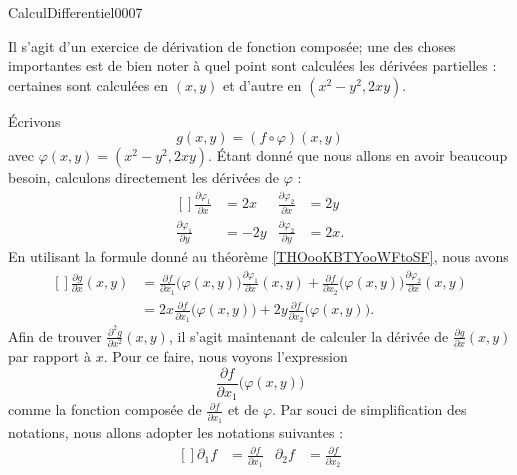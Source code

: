 \begin{corrige}{CalculDifferentiel0007}

	Il s'agit d'un exercice de dérivation de fonction composée; une des choses importantes est de bien noter à quel point sont calculées les dérivées partielles : certaines sont calculées en $(x,y)$ et d'autre en $(x^2-y^2,2xy)$. 

	Écrivons
	\begin{equation}
		g(x,y)=(f\circ\varphi)(x,y)
	\end{equation}
	avec $\varphi(x,y)=(x^2-y^2,2xy)$. Étant donné que nous allons en avoir beaucoup besoin, calculons directement les dérivées de $\varphi$ :
	\begin{equation}
		\begin{aligned}[]
			\frac{ \partial \varphi_1 }{ \partial x }&=2x	&\frac{ \partial \varphi_2 }{ \partial x }&=2y\\
			\frac{ \partial \varphi_1 }{ \partial y }&=-2y	&\frac{ \partial \varphi_2 }{ \partial y }&=2x.
		\end{aligned}
	\end{equation}
    En utilisant la formule donné au théorème  \ref{THOooKBTYooWFtoSF}, nous avons
	\begin{equation}
		\begin{aligned}[]
			\frac{ \partial g }{ \partial x }(x,y)&=\frac{ \partial f }{ \partial x_1 }\big( \varphi(x,y) \big)\frac{ \partial \varphi_1 }{ \partial x }(x,y)+\frac{ \partial f }{ \partial x_2 }\big( \varphi(x,y) \big)\frac{ \partial \varphi_2 }{ \partial x }(x,y)\\
			&=2x\frac{ \partial f }{ \partial x_1 }\big( \varphi(x,y) \big)+2y\frac{ \partial f }{ \partial x_2 }\big( \varphi(x,y) \big).
		\end{aligned}
	\end{equation}
	Afin de trouver $\frac{ \partial^2g }{ \partial x^2 }(x,y)$, il s'agit maintenant de calculer la dérivée de $\frac{ \partial g }{ \partial x }(x,y)$ par rapport à $x$. Pour ce faire, nous voyons l'expression
	\begin{equation}
		\frac{ \partial f }{ \partial x_1 }\big( \varphi(x,y) \big)
	\end{equation}
	comme la fonction composée de $\frac{ \partial f }{ \partial x_1 }$ et de $\varphi$. Par souci de simplification des notations, nous allons adopter les notations suivantes :
	\begin{equation}
		\begin{aligned}[]
			\partial_1f&=\frac{ \partial f }{ \partial x_1 }&\partial_2f&=\frac{ \partial f }{ \partial x_2 }\\

\end{aligned}
\end{equation}
\end{corrige}
